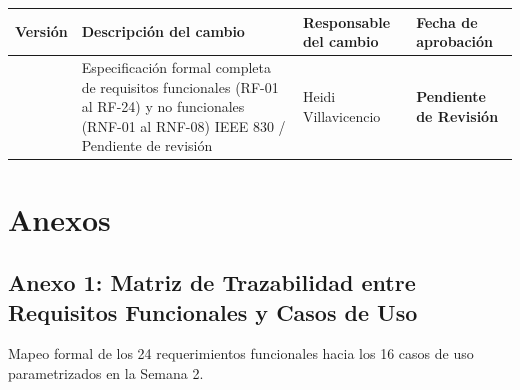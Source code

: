 \documentclass[12pt,a4paper]{article}
\begin{document}
\noindent
\renewcommand{\arraystretch}{1.2}
\begin{tabularx}{\textwidth}{|>{\hsize=0.45\hsize\centering\arraybackslash}X|>{\hsize=1.55\hsize\raggedright\arraybackslash}X|>{\hsize=1.2\hsize\raggedright\arraybackslash}X|>{\hsize=0.8\hsize\centering\arraybackslash}X|}
    \hline
    \rowcolor{gray!20}
    \textbf{Versión} & \textbf{Descripción del cambio} & \textbf{Responsable del cambio} & \textbf{Fecha de aprobación} \\
    \hline
    1.0 & Especificación formal completa de requisitos funcionales (RF-01 al RF-24) y no funcionales (RNF-01 al RNF-08) IEEE 830 / Pendiente de revisión & Heidi Villavicencio & \textbf{\textcolor{gray!90}{Pendiente de Revisión}} \\
    \hline
\end{tabularx}

\vspace{0.4cm}

\section{Anexos}
\subsection*{Anexo 1: Matriz de Trazabilidad entre Requisitos Funcionales y Casos de Uso}
Mapeo formal de los 24 requerimientos funcionales hacia los 16 casos de uso parametrizados en la Semana 2.
\end{document}
